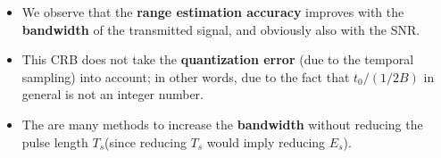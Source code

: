 \begin{itemize}
\begin{align*}
\frac{d \ln L(t_0)}{dt_0} &= \frac{2}{N_0} \int_0^T \left( x(t) - s(t-t_0) \right) \frac{ds(t-t_0)}{dt_0} dt \\[2ex]
\frac{d^2 \ln L(t_0)}{dt_0^2} &= \frac{2}{N_0} \int_0^T \left( x(t) - s(t-t_0) \right) \frac{d^2 s(t-t_0)}{dt_0^2} dt - \frac{2}{N_0} \int_0^T \left( \frac{ds(t-t_0)}{dt_0} \right)^2 dt
\end{align*}
\begin{align*}
I(t_0) &= -E\left\{\frac{d^2 \ln L(t_0)}{dt_0^2}\right\} = \frac{2}{N_0} \int_0^T \left(\frac{d s(t-t_0)}{dt_0}\right)^2 dt \\[2ex]
MSE\left\{\hat{t}_{0ML}\right\} &\geq CRB(t_0) = \frac{1}{I(t_0)} = \frac{N_0/2}{\int_0^T \left(\frac{d s(t-t_0)}{dt_0}\right)^2 dt} 
= \frac{N_0/2}{\int_{t_0}^{t_0+T_s} \left(\frac{d s(t-t_0)}{dt_0}\right)^2 dt} 
= \frac{N_0/2}{\int_0^{T_s} \left(\frac{d s(t)}{dt}\right)^2 dt} \\[2ex]
&= \frac{N_0/2}{\int_{-\infty}^{+\infty} |j 2\pi f \cdot S(f)|^2 df}
= \frac{N_0/2}{E_S \bar{\beta}^2} \\[2ex]
\bar{\beta}^2 &\triangleq \frac{\int_{-\infty}^{+\infty} |2\pi f \cdot S(f)|^2 df}{\int_{-\infty}^{+\infty} |S(f)|^2 df}
= \frac{\int_{-\infty}^{+\infty} (2\pi f)^2 |S(f)|^2 df}{E_S}
\end{align*}
    \[
n_0 = \left\lceil \frac{t_0}{1/2B} \right\rceil, \qquad
R = \frac{c}{2} t_0, \qquad
\mathrm{SNR} \triangleq \frac{E_s}{\sigma_w^2} = \frac{E_s}{N_0 / 2}, \qquad
\hat{R}_{ML} = \frac{c}{2} \hat{t}_{0ML} = \frac{c}{2} \left( \frac{\hat{n}_{0ML}}{2B} \right)
\]
\begin{align*}
\mathrm{MSE}\left\{ \hat{t}_{0ML} \right\} &\geq \mathrm{CRB}(t_0) = \frac{N_0 / 2}{E_s \beta^2} = \frac{1}{\mathrm{SNR} \cdot \beta^2}\\[3pt]
\mathrm{MSE}\left\{ \hat{R}_{ML} \right\} &\geq \mathrm{CRB}(R) = \frac{c^2}{4} \cdot \mathrm{CRB}(t_0) = \frac{c^2}{4 \mathrm{SNR} \cdot \beta^2}
\end{align*}
    \item We observe that the \textbf{range estimation accuracy} improves with the \textbf{bandwidth} of the transmitted signal, and obviously also with the SNR.
    \item This CRB does not take the \textbf{quantization error} (due to the temporal sampling) into account; in other words, due to the fact that \(t_0/(1/2B)\) in general is not an integer number.
    \item The are many methods to increase the \textbf{bandwidth} without reducing the pulse length \(T_s\)(since reducing \(T_s\) would imply reducing \(E_s\)).

\end{itemize}
